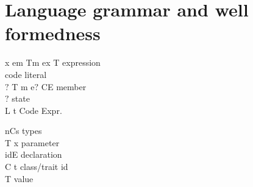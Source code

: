 \section{Language grammar and well formedness}
\begin{minipage}{0.63\textwidth}
\begin{bnf}
      {x \mmid{} em \mmid{}Tm
\mmid{} ex \mmid{}  T
}{expression}\\      {
\mmid{} 
}        {code literal}\\      {$?$ T m e$?$ \mmid{} C\eq{}E }                                                    {member}\\      {$?$}                                          {state}\\      {L \mmid{} t \mmid{}  \mmid{} }           {Code Expr.}%
\end{bnf}
\end{minipage}
\begin{minipage}[t]{0.5\textwidth}
\begin{bnf}
      {nCs}                                                 {types}\\     {T x}                                                              {parameter}\\      {id\eq{}E}                                                         {declaration}\\     {C \mmid{} t}                                                      {class/trait id}\\      { T}                                                 {value}%
\end{bnf}
\end{minipage}


